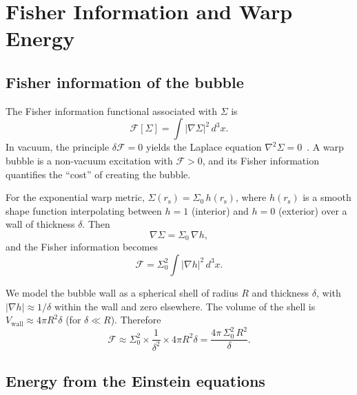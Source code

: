 \documentclass[prd,twocolumn,superscriptaddress,longbibliography]{revtex4-2}
\newcommand{\rs}{r_{\mathrm{s}}}
\newcommand{\Fisher}{\mathcal{F}}
\begin{document}
\section{Fisher Information and Warp Energy}
\label{sec:fisher}

\subsection{Fisher information of the bubble}

The Fisher information functional associated with $\Sigma$ is
\begin{equation}
\label{eq:Fisher_def}
\Fisher[\Sigma] = \int |\nabla\Sigma|^2\,d^3x.
\end{equation}
In vacuum, the principle $\delta\Fisher = 0$ yields the Laplace
equation $\nabla^2\Sigma = 0$~\cite{Huang2026b}.  A warp bubble
is a non-vacuum excitation with $\Fisher > 0$, and its Fisher
information quantifies the ``cost'' of creating the bubble.

For the exponential warp metric,
$\Sigma(\rs) = \Sigma_0\,h(\rs)$, where $h(\rs)$ is a smooth shape
function interpolating between $h = 1$ (interior) and $h = 0$
(exterior) over a wall of thickness $\delta$.  Then
\begin{equation}
\label{eq:grad_sigma}
\nabla\Sigma = \Sigma_0\,\nabla h,
\end{equation}
and the Fisher information becomes
\begin{equation}
\label{eq:Fisher_bubble}
\Fisher = \Sigma_0^2 \int |\nabla h|^2\,d^3x.
\end{equation}

We model the bubble wall as a spherical shell of radius $R$ and
thickness $\delta$, with $|\nabla h| \approx 1/\delta$
within the wall and zero elsewhere.  The volume of the shell is
$V_{\mathrm{wall}} \approx 4\pi R^2\delta$ (for $\delta \ll R$).
Therefore
\begin{equation}
\label{eq:Fisher_est}
\Fisher \approx \Sigma_0^2 \times \frac{1}{\delta^2} \times 4\pi R^2 \delta
= \frac{4\pi\,\Sigma_0^2\,R^2}{\delta}.
\end{equation}

\subsection{Energy from the Einstein equations}
\end{document}
